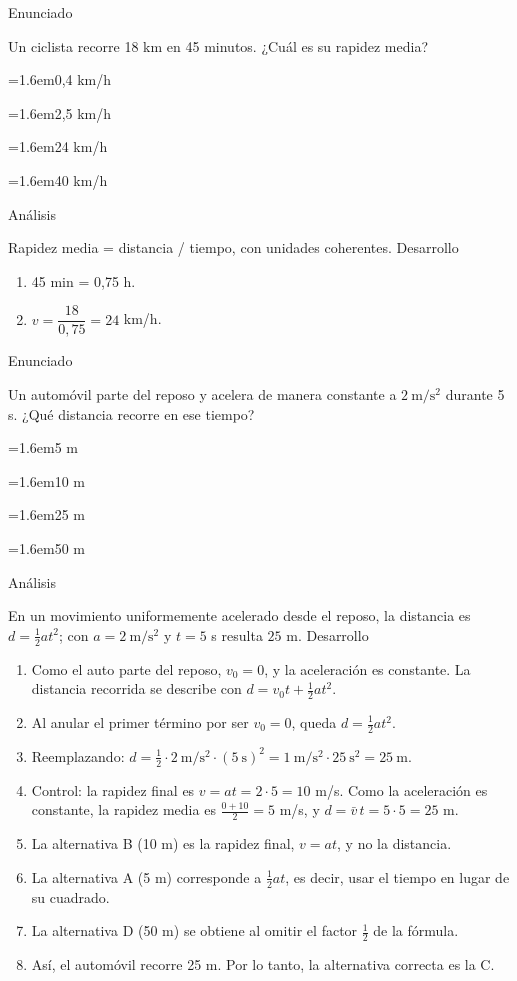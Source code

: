 \documentclass[10pt,a4paper,twocolumn]{article}
\newcommand{\alternativa}[2]{\par\noindent\hangindent=1.6em\hangafter=1\makebox[1.6em][l]{\tecla{#1}}#2\par}
\newcommand{\clave}[1]{\par\smallskip{\sffamily\footnotesize\color{esmeralda} Clave \teclaok{#1}}\par}
\begin{document}
\begin{ejemplo}
{\sffamily\footnotesize\color{zinc500} Enunciado}\par
Un ciclista recorre 18 km en 45 minutos. ¿Cuál es su rapidez media?
\alternativa{A}{0,4 km/h}
\alternativa{B}{2,5 km/h}
\alternativa{C}{24 km/h}
\alternativa{D}{40 km/h}
\clave{C}
{\sffamily\footnotesize\color{zinc500} Análisis}\par Rapidez media = distancia / tiempo, con unidades coherentes.
{\sffamily\footnotesize\color{zinc500} Desarrollo}
\begin{enumerate}
  \item 45 min = 0,75 h.
  \item $v=\dfrac{18}{0{,}75}=24$ km/h.
\end{enumerate}
\end{ejemplo}

\begin{ejemplo}
{\sffamily\footnotesize\color{zinc500} Enunciado}\par
Un automóvil parte del reposo y acelera de manera constante a $2\ \mathrm{m/s^2}$ durante 5 s. ¿Qué distancia recorre en ese tiempo?
\alternativa{A}{5 m}
\alternativa{B}{10 m}
\alternativa{C}{25 m}
\alternativa{D}{50 m}
\clave{C}
{\sffamily\footnotesize\color{zinc500} Análisis}\par En un movimiento uniformemente acelerado desde el reposo, la distancia es $d = \tfrac{1}{2}at^2$; con $a = 2\ \mathrm{m/s^2}$ y $t = 5$ s resulta $25$ m.
{\sffamily\footnotesize\color{zinc500} Desarrollo}
\begin{enumerate}
  \item Como el auto parte del reposo, $v_0 = 0$, y la aceleración es constante. La distancia recorrida se describe con $d = v_0 t + \tfrac{1}{2}at^2$.
  \item Al anular el primer término por ser $v_0 = 0$, queda $d = \tfrac{1}{2}at^2$.
  \item Reemplazando: $d = \tfrac{1}{2}\cdot 2\ \mathrm{m/s^2}\cdot (5\ \mathrm{s})^2 = 1\ \mathrm{m/s^2}\cdot 25\ \mathrm{s^2} = 25\ \mathrm{m}$.
  \item Control: la rapidez final es $v = at = 2 \cdot 5 = 10$ m/s. Como la aceleración es constante, la rapidez media es $\frac{0 + 10}{2} = 5$ m/s, y $d = \bar{v}\,t = 5\cdot 5 = 25$ m.
  \item La alternativa B (10 m) es la rapidez final, $v = at$, y no la distancia.
  \item La alternativa A (5 m) corresponde a $\tfrac{1}{2}at$, es decir, usar el tiempo en lugar de su cuadrado.
  \item La alternativa D (50 m) se obtiene al omitir el factor $\tfrac{1}{2}$ de la fórmula.
  \item Así, el automóvil recorre 25 m. Por lo tanto, la alternativa correcta es la C.
\end{enumerate}
\end{ejemplo}
\end{document}
